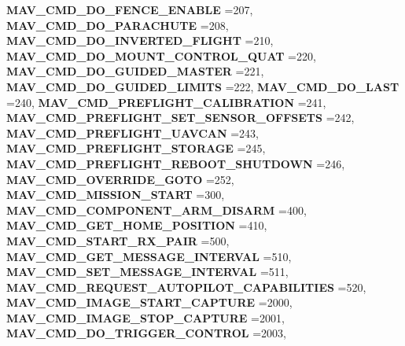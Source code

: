 \begin{DoxyCompactItemize}
\textbf{ M\+A\+V\+\_\+\+C\+M\+D\+\_\+\+D\+O\+\_\+\+F\+E\+N\+C\+E\+\_\+\+E\+N\+A\+B\+LE} =207, 
\textbf{ M\+A\+V\+\_\+\+C\+M\+D\+\_\+\+D\+O\+\_\+\+P\+A\+R\+A\+C\+H\+U\+TE} =208, 
\textbf{ M\+A\+V\+\_\+\+C\+M\+D\+\_\+\+D\+O\+\_\+\+I\+N\+V\+E\+R\+T\+E\+D\+\_\+\+F\+L\+I\+G\+HT} =210, 
\newline
\textbf{ M\+A\+V\+\_\+\+C\+M\+D\+\_\+\+D\+O\+\_\+\+M\+O\+U\+N\+T\+\_\+\+C\+O\+N\+T\+R\+O\+L\+\_\+\+Q\+U\+AT} =220, 
\textbf{ M\+A\+V\+\_\+\+C\+M\+D\+\_\+\+D\+O\+\_\+\+G\+U\+I\+D\+E\+D\+\_\+\+M\+A\+S\+T\+ER} =221, 
\textbf{ M\+A\+V\+\_\+\+C\+M\+D\+\_\+\+D\+O\+\_\+\+G\+U\+I\+D\+E\+D\+\_\+\+L\+I\+M\+I\+TS} =222, 
\textbf{ M\+A\+V\+\_\+\+C\+M\+D\+\_\+\+D\+O\+\_\+\+L\+A\+ST} =240, 
\newline
\textbf{ M\+A\+V\+\_\+\+C\+M\+D\+\_\+\+P\+R\+E\+F\+L\+I\+G\+H\+T\+\_\+\+C\+A\+L\+I\+B\+R\+A\+T\+I\+ON} =241, 
\textbf{ M\+A\+V\+\_\+\+C\+M\+D\+\_\+\+P\+R\+E\+F\+L\+I\+G\+H\+T\+\_\+\+S\+E\+T\+\_\+\+S\+E\+N\+S\+O\+R\+\_\+\+O\+F\+F\+S\+E\+TS} =242, 
\textbf{ M\+A\+V\+\_\+\+C\+M\+D\+\_\+\+P\+R\+E\+F\+L\+I\+G\+H\+T\+\_\+\+U\+A\+V\+C\+AN} =243, 
\textbf{ M\+A\+V\+\_\+\+C\+M\+D\+\_\+\+P\+R\+E\+F\+L\+I\+G\+H\+T\+\_\+\+S\+T\+O\+R\+A\+GE} =245, 
\newline
\textbf{ M\+A\+V\+\_\+\+C\+M\+D\+\_\+\+P\+R\+E\+F\+L\+I\+G\+H\+T\+\_\+\+R\+E\+B\+O\+O\+T\+\_\+\+S\+H\+U\+T\+D\+O\+WN} =246, 
\textbf{ M\+A\+V\+\_\+\+C\+M\+D\+\_\+\+O\+V\+E\+R\+R\+I\+D\+E\+\_\+\+G\+O\+TO} =252, 
\textbf{ M\+A\+V\+\_\+\+C\+M\+D\+\_\+\+M\+I\+S\+S\+I\+O\+N\+\_\+\+S\+T\+A\+RT} =300, 
\textbf{ M\+A\+V\+\_\+\+C\+M\+D\+\_\+\+C\+O\+M\+P\+O\+N\+E\+N\+T\+\_\+\+A\+R\+M\+\_\+\+D\+I\+S\+A\+RM} =400, 
\newline
\textbf{ M\+A\+V\+\_\+\+C\+M\+D\+\_\+\+G\+E\+T\+\_\+\+H\+O\+M\+E\+\_\+\+P\+O\+S\+I\+T\+I\+ON} =410, 
\textbf{ M\+A\+V\+\_\+\+C\+M\+D\+\_\+\+S\+T\+A\+R\+T\+\_\+\+R\+X\+\_\+\+P\+A\+IR} =500, 
\textbf{ M\+A\+V\+\_\+\+C\+M\+D\+\_\+\+G\+E\+T\+\_\+\+M\+E\+S\+S\+A\+G\+E\+\_\+\+I\+N\+T\+E\+R\+V\+AL} =510, 
\textbf{ M\+A\+V\+\_\+\+C\+M\+D\+\_\+\+S\+E\+T\+\_\+\+M\+E\+S\+S\+A\+G\+E\+\_\+\+I\+N\+T\+E\+R\+V\+AL} =511, 
\newline
\textbf{ M\+A\+V\+\_\+\+C\+M\+D\+\_\+\+R\+E\+Q\+U\+E\+S\+T\+\_\+\+A\+U\+T\+O\+P\+I\+L\+O\+T\+\_\+\+C\+A\+P\+A\+B\+I\+L\+I\+T\+I\+ES} =520, 
\textbf{ M\+A\+V\+\_\+\+C\+M\+D\+\_\+\+I\+M\+A\+G\+E\+\_\+\+S\+T\+A\+R\+T\+\_\+\+C\+A\+P\+T\+U\+RE} =2000, 
\textbf{ M\+A\+V\+\_\+\+C\+M\+D\+\_\+\+I\+M\+A\+G\+E\+\_\+\+S\+T\+O\+P\+\_\+\+C\+A\+P\+T\+U\+RE} =2001, 
\textbf{ M\+A\+V\+\_\+\+C\+M\+D\+\_\+\+D\+O\+\_\+\+T\+R\+I\+G\+G\+E\+R\+\_\+\+C\+O\+N\+T\+R\+OL} =2003, 

\end{DoxyCompactItemize}
